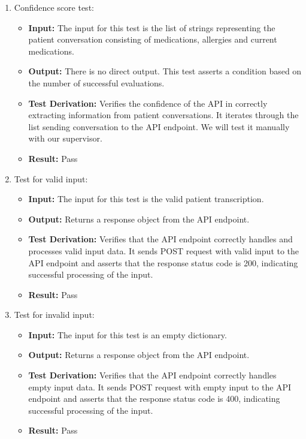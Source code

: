 \documentclass[12pt, titlepage]{article}
\begin{document}
  \begin{enumerate}
    \item Confidence score test:
      \begin{itemize}
        \item \textbf{Input:} The input for this test is the list of strings representing the patient conversation consisting of medications, allergies and current medications.   
        \item \textbf{Output:} There is no direct output. This test asserts a condition based on the number of successful evaluations.
        \item \textbf{Test Derivation:} Verifies the confidence of the API in correctly extracting information from patient conversations. It iterates through the list sending conversation to the API endpoint. We will test it manually with our supervisor. 
        \item \textbf{Result:} Pass
      \end{itemize}

    \item Test for valid input:
      \begin{itemize}
        \item \textbf{Input:} The input for this test is the valid patient transcription. 
        \item \textbf{Output:} Returns a response object from the API endpoint. 
        \item \textbf{Test Derivation:} Verifies that the API endpoint correctly handles and processes valid input data. It sends POST request with valid input to the API endpoint and asserts that the response status code is 200, indicating successful processing of the input.
        \item \textbf{Result:} Pass
      \end{itemize}

      \item Test for invalid input:
      \begin{itemize}
        \item \textbf{Input:} The input for this test is an empty dictionary. 
        \item \textbf{Output:} Returns a response object from the API endpoint. 
        \item \textbf{Test Derivation:} Verifies that the API endpoint correctly handles empty input data. It sends POST request with empty input to the API endpoint and asserts that the response status code is 400, indicating successful processing of the input.
        \item \textbf{Result:} Pass
      \end{itemize}
  \end{enumerate}
\end{document}
